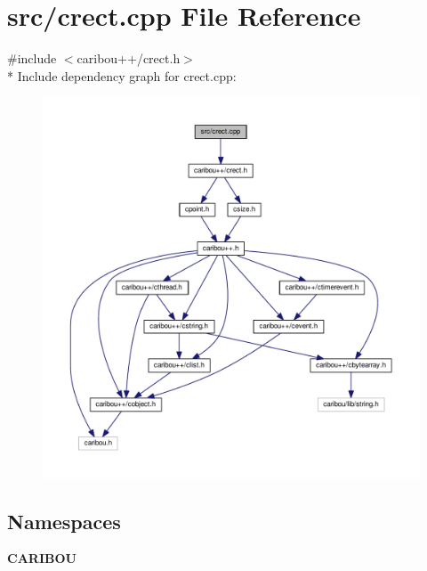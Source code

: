\section{src/crect.cpp File Reference}
\label{crect_8cpp}
{\ttfamily \#include $<$caribou++/crect.\+h$>$}\\*
Include dependency graph for crect.\+cpp\+:
\nopagebreak
\begin{figure}[H]
\begin{center}
\leavevmode
\includegraphics[width=350pt]{crect_8cpp__incl}
\end{center}
\end{figure}
\subsection*{Namespaces}
\begin{DoxyCompactItemize}
\item 
 {\bf C\+A\+R\+I\+B\+OU}
\end{DoxyCompactItemize}
